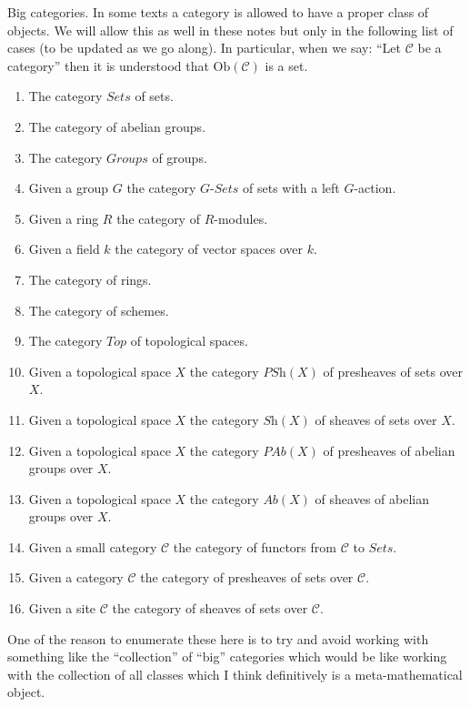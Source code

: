 \begin{remark}
\label{remark-big-categories}
Big categories. In some texts a category is allowed to have a proper
class of objects. We will allow this as well in these notes but only
in the following list of cases (to be updated as we go along).
In particular, when we say: ``Let $\mathcal{C}$ be a category''
then it is understood that $\text{Ob}(\mathcal{C})$ is a set.
\begin{enumerate}
\item The category $\textit{Sets}$ of sets.
\item The category of abelian groups.
\item The category $\textit{Groups}$ of groups.
\item Given a group $G$ the category $G\textit{-Sets}$ of
sets with a left $G$-action.
\item Given a ring $R$ the category of $R$-modules.
\item Given a field $k$ the category of vector spaces over $k$.
\item The category of rings.
\item The category of schemes.
\item The category $\textit{Top}$ of topological spaces.
\item Given a topological space $X$ the category
$\textit{PSh}(X)$ of presheaves of sets over $X$.
\item Given a topological space $X$ the category
$\textit{Sh}(X)$ of sheaves of sets over $X$.
\item Given a topological space $X$ the category
$\textit{PAb}(X)$ of presheaves of abelian groups over $X$.
\item Given a topological space $X$ the category
$\textit{Ab}(X)$ of sheaves of abelian groups over $X$.
\item Given a small category $\mathcal{C}$ the category of functors
from $\mathcal{C}$ to $\textit{Sets}$.
\item Given a category $\mathcal{C}$ the category of presheaves of sets
over $\mathcal{C}$.
\item Given a site $\mathcal{C}$ the category of sheaves
of sets over $\mathcal{C}$.
\end{enumerate}
One of the reason to enumerate these here is to try and avoid
working with something like the ``collection'' of ``big'' categories
which would be like working with the collection of all classes
which I think definitively is a meta-mathematical object.
\end{remark}

